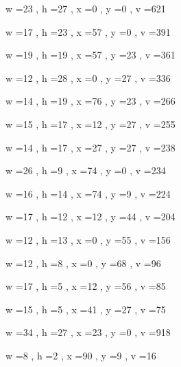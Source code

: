 \documentclass[11pt]{article}
\begin{document}
w =23 , h =27 , x =0 , y =0 , v =621
\par
w =17 , h =23 , x =57 , y =0 , v =391
\par
w =19 , h =19 , x =57 , y =23 , v =361
\par
w =12 , h =28 , x =0 , y =27 , v =336
\par
w =14 , h =19 , x =76 , y =23 , v =266
\par
w =15 , h =17 , x =12 , y =27 , v =255
\par
w =14 , h =17 , x =27 , y =27 , v =238
\par
w =26 , h =9 , x =74 , y =0 , v =234
\par
w =16 , h =14 , x =74 , y =9 , v =224
\par
w =17 , h =12 , x =12 , y =44 , v =204
\par
w =12 , h =13 , x =0 , y =55 , v =156
\par
w =12 , h =8 , x =0 , y =68 , v =96
\par
w =17 , h =5 , x =12 , y =56 , v =85
\par
w =15 , h =5 , x =41 , y =27 , v =75
\par
w =34 , h =27 , x =23 , y =0 , v =918
\par
w =8 , h =2 , x =90 , y =9 , v =16
\par
\newpage
\end{document}
